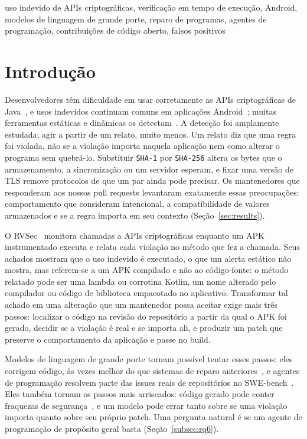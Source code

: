 \documentclass[conference]{IEEEtran}
\begin{document}
\begin{IEEEkeywords}
uso indevido de APIs criptográficas, verificação em tempo de execução, Android, modelos de linguagem
de grande porte, reparo de programas, agentes de programação, contribuições de código aberto, falsos
positivos
\end{IEEEkeywords}

\section{Introdução}
\label{sec:introduction}

Desenvolvedores têm dificuldade em usar corretamente as APIs criptográficas
de Java~\cite{nadi2016hoops}, e usos indevidos continuam comuns em aplicações
Android~\cite{egele2013crypto,costa2026rv4android}; muitas ferramentas estáticas e
dinâmicas os detectam~\cite{krueger2017cognicrypt,krueger2021crysl,
rahaman2019cryptoguard,piccolboni2021crylogger,torres2023runtime}. A detecção foi
amplamente estudada; agir a partir de um relato, muito menos. Um relato diz que uma
regra foi violada, não se a violação importa naquela aplicação nem como
alterar o programa sem quebrá-lo. Substituir \texttt{SHA-1} por
\texttt{SHA-256} altera os bytes que o armazenamento, a sincronização ou um servidor
esperam, e fixar uma versão de TLS remove protocolos de que um par ainda pode precisar. Os
mantenedores que responderam aos nossos pull requests levantaram exatamente essas preocupações:
comportamento que consideram intencional, a compatibilidade de valores armazenados e
se a regra importa em seu contexto (Seção~\ref{sec:results}).

O RVSec~\cite{torres2023runtime,costa2026rv4android} monitora chamadas a APIs criptográficas enquanto um
APK instrumentado executa e relata cada violação no método que fez a
chamada. Seus achados mostram que o uso indevido é executado, o que um alerta estático não
mostra, mas referem-se a um APK compilado e não ao código-fonte: o método
relatado pode ser uma lambda ou corrotina Kotlin, um nome alterado pelo compilador ou
código de biblioteca empacotado no aplicativo. Transformar tal achado em uma alteração que um
mantenedor possa aceitar exige mais três passos: localizar o código na
revisão do repositório a partir da qual o APK foi gerado, decidir se a violação é
real e se importa ali, e produzir um patch que preserve o comportamento da aplicação
e passe no build.

Modelos de linguagem de grande porte tornam possível tentar esses passos: eles corrigem código,
às vezes melhor do que sistemas de reparo
anteriores~\cite{xia2023apr,zhang2023apimisuse}, e agentes de programação resolvem parte das issues reais
de repositórios no SWE-bench~\cite{jimenez2024swebench,yang2024sweagent}. Eles também tornam os passos mais arriscados: código gerado pode conter
fraquezas de segurança~\cite{pearce2022asleep}, e um modelo pode
errar tanto sobre se uma violação importa quanto sobre seu próprio patch. Uma
pergunta natural é se um agente de programação de propósito geral basta
(Seção~\ref{subsec:rq6}).
\end{document}
